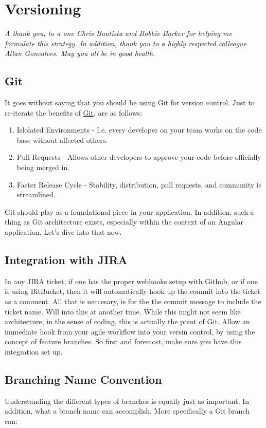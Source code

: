\chapter{ Versioning }

\textit{A thank you, to a one Chris Bautista and Bobbie Barker for helping me formulate this strategy. In addition, thank you to a highly respected colleague Allan Goncalves. May you all be in good health.}
\section { Git }
It goes without saying that you should be using Git for version control. Just to re-iterate the benefits of \href{https://git-scm.com/}{Git}, are as follows: 
\begin{enumerate} 
  \item Islolated Environments - I.e. every developer on your team works on the code base without affected others. 
  \item Pull Requests - Allows other developers to approve your code before officially being merged in. 
  \item Faster Release Cycle - Stability, distribution, pull requests, and community is streamlined. 
\end{enumerate} 

Git should play as a foundational piece in your application. In addition, such a thing as Git architecture exists, especially within the context of an Angular application. Let's dive into that now. 

\section { Integration with JIRA }
In any JIRA ticket, if one has the proper webhooks setup with Github, or if one
is using BitBucket, then it will automatically hook up the commit into the
ticket as a comment. All that is neccesary, is for the the commit message to include the ticket name. Will into this at another time. While this might not seem like architecture, in the sense of coding, this is actually the point of Git. Allow an immediate hook from your agile workflow into your versin control, by using the concept of feature branches. So first and foremost, make sure you have this integration set up. 

\section { Branching Name Convention }
Understanding the different types of branches is equally just as important. In addition, what a branch name can accomplish. More specifically a Git branch can:

